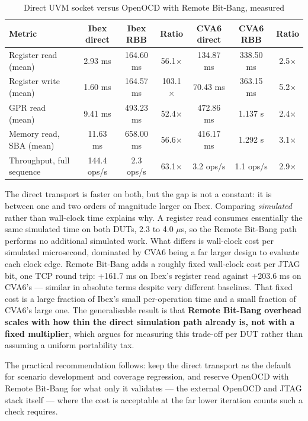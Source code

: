 \documentclass[conference]{IEEEtran}
\begin{document}
\begin{table}[!t]
\caption{Direct UVM socket versus OpenOCD with Remote Bit-Bang, measured}
\label{tab:VI}
\centering
\footnotesize
\begin{tabular}{lcccccc}
\toprule
Metric & Ibex direct & Ibex RBB & Ratio & CVA6 direct & CVA6 RBB & Ratio \\
\midrule
Register read (mean) & 2.93 ms & 164.60 ms & 56.1$\times$ & 134.87 ms & 338.50 ms & 2.5$\times$ \\
Register write (mean) & 1.60 ms & 164.57 ms & 103.1$\times$ & 70.43 ms & 363.15 ms & 5.2$\times$ \\
GPR read (mean) & 9.41 ms & 493.23 ms & 52.4$\times$ & 472.86 ms & 1.137 s & 2.4$\times$ \\
Memory read, SBA (mean) & 11.63 ms & 658.00 ms & 56.6$\times$ & 416.17 ms & 1.292 s & 3.1$\times$ \\
Throughput, full sequence & 144.4 ops/s & 2.3 ops/s & 63.1$\times$ & 3.2 ops/s & 1.1 ops/s & 2.9$\times$ \\
\bottomrule
\end{tabular}
\end{table}

The direct transport is faster on both, but the gap is not a constant: it is between one and two orders of magnitude larger on Ibex. Comparing \textit{simulated} rather than wall-clock time explains why. A register read consumes essentially the same simulated time on both DUTs, 2.3 to 4.0 $\mu$s, so the Remote Bit-Bang path performs no additional simulated work. What differs is wall-clock cost per simulated microsecond, dominated by CVA6 being a far larger design to evaluate each clock edge. Remote Bit-Bang adds a roughly fixed wall-clock cost per JTAG bit, one TCP round trip: +161.7 ms on Ibex's register read against +203.6 ms on CVA6's --- similar in absolute terms despite very different baselines. That fixed cost is a large fraction of Ibex's small per-operation time and a small fraction of CVA6's large one. The generalisable result is that \textbf{Remote Bit-Bang overhead scales with how thin the direct simulation path already is, not with a fixed multiplier}, which argues for measuring this trade-off per DUT rather than assuming a uniform portability tax.

The practical recommendation follows: keep the direct transport as the default for scenario development and coverage regression, and reserve OpenOCD with Remote Bit-Bang for what only it validates --- the external OpenOCD and JTAG stack itself --- where the cost is acceptable at the far lower iteration counts such a check requires.
\end{document}
